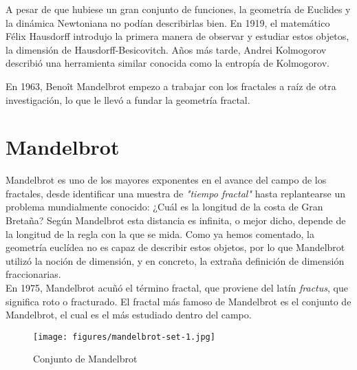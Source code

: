 \noindent A pesar de que hubiese un gran conjunto de funciones, la geometría de Euclides y la dinámica Newtoniana no podían describirlas bien. En 1919, el matemático Félix Hausdorff introdujo la primera manera de observar y estudiar estos objetos, la dimensión de Hausdorff-Besicovitch. Años más tarde, Andrei Kolmogorov describió una herramienta similar conocida como la entropía de Kolmogorov.

\noindent En 1963, Benoît Mandelbrot empezo a trabajar con los fractales a raíz de otra investigación, lo que le llevó a fundar la geometría fractal.

\section{Mandelbrot}

\noindent Mandelbrot es uno de los mayores exponentes en el avance del campo de los fractales, desde identificar una muestra de \textit{"tiempo fractal"} hasta replantearse un problema mundialmente conocido: ¿Cuál es la longitud de la costa de Gran Bretaña? Según Mandelbrot esta distancia es infinita, o mejor dicho, depende de la longitud de la regla con la que se mida. Como ya hemos comentado, la geometría euclídea no es capaz de describir estos objetos, por lo que Mandelbrot utilizó la noción de dimensión, y en concreto, la extraña definición de dimensión fraccionarias.\\

\noindent En 1975, Mandelbrot acuñó el término fractal, que proviene del latín \textit{fractus}, que significa roto o fracturado. El fractal más famoso de Mandelbrot es el conjunto de Mandelbrot, el cual es el más estudiado dentro del campo.

\begin{figure}[H]
    \centering
    \texttt{[image: figures/mandelbrot-set-1.jpg]}
    \caption{Conjunto de Mandelbrot}
    \label{fig:mandelbrot-set}
\end{figure}